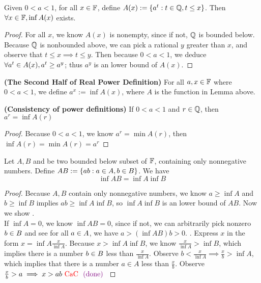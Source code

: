 \documentclass{report}
\begin{document}
\begin{lemma}
  Given $0<a<1$, for all $x\in\mathbb{F}$, define $A(x):=\{ a^t:t\in\mathbb{Q},t\leq x \}$. Then $\forall x\in\mathbb{F}, \inf A(x)$ exists.
\end{lemma}
\begin{proof}
For all $x$,  we know $A(x)$ is nonempty, since if not, $\mathbb{Q}$ is bounded below. Because $\mathbb{Q}$ is nonbounded above, we can pick a rational  $y$ greater than $x$, and observe that $t\leq x\implies t\leq y$. Then because $0<a<1$, we deduce  $\forall a^t\in A(x),a^t\geq a^y $; thus $a^y$ is an lower bound of  $A(x)$.      
\end{proof}
\begin{definition}
\textbf{(The Second Half of Real Power Definition)} For all $a,x\in\mathbb{F}$ where $0<a<1$, we define  $a^x:=\inf  A(x)$, where $A$ is the function in Lemma above.
\end{definition}
\begin{theorem}
\textbf{(Consistency of power definitions)} If $0<a<1$ and  $r\in\mathbb{Q}$, then $a^r=\inf A(r)$
\end{theorem}
\begin{proof}
Because $0<a<1$, we know  $a^r=\min A(r)$, then $\inf A(r)=\min A(r)=a^r$   
\end{proof}
\begin{lemma}
\label{1.4.9}
Let $A,B$ and be two bounded below subset of  $\mathbb{F}$, containing only nonnegative numbers. Define $AB:=\{ ab:a\in A,b\in B \}$. We have    
\begin{equation}
\inf  AB=\inf  A \inf  B
\end{equation}
\end{lemma}
\begin{proof}
Because $A,B$ contain only nonnegative numbers, we know $a\geq \inf  A$ and $b\geq \inf  B$ implies $ab\geq \inf  A \inf  B$, so $\inf  A \inf  B$ is an lower bound of $AB$. Now we show .\\

If $\inf A=0$, we know $\inf AB=0$, since if not, we can arbitrarily pick nonzero $b\in B$ and see for all $a\in A$, we have $a>(\inf AB)b>0$. . Express $x$ in the form  $x=\inf  A \frac{x}{\inf  A}$. Because $x>\inf  A \inf  B$, we know $\frac{x}{\inf  A}>\inf  B$, which implies there is a number  $b\in B$ less than $\frac{x}{\inf  A}$. Observe $b<\frac{x}{\inf  A}\implies \frac{x}{b}>\inf  A$, which implies that there is a number $a\in A$ less than  $\frac{x}{b}$. Observe  $\frac{x}{b}>a\implies x>ab \text{ \textcolor{red}{CaC} }\textcolor{violet}{\text{ (done) }}$  
\end{proof}
\end{document}

